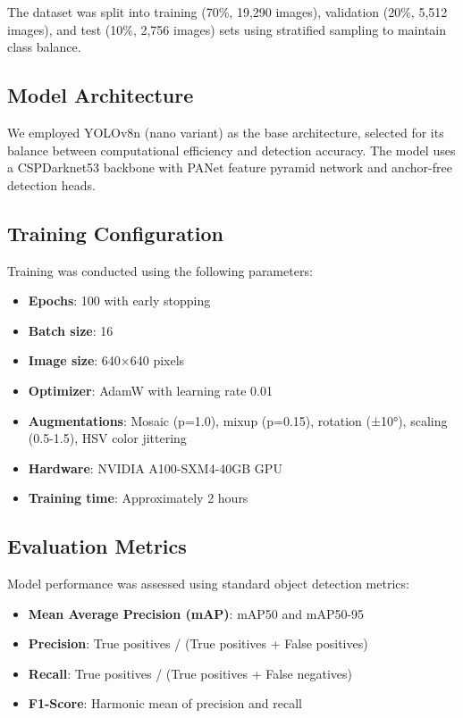 \documentclass[10pt,twocolumn]{article}
\begin{document}
The dataset was split into training (70\%, 19,290 images), validation (20\%, 5,512 images), and test (10\%, 2,756 images) sets using stratified sampling to maintain class balance.

\subsection{Model Architecture}

We employed YOLOv8n (nano variant) as the base architecture, selected for its balance between computational efficiency and detection accuracy. The model uses a CSPDarknet53 backbone with PANet feature pyramid network and anchor-free detection heads.

\subsection{Training Configuration}

Training was conducted using the following parameters:
\begin{itemize}
\item \textbf{Epochs}: 100 with early stopping
\item \textbf{Batch size}: 16
\item \textbf{Image size}: 640×640 pixels
\item \textbf{Optimizer}: AdamW with learning rate 0.01
\item \textbf{Augmentations}: Mosaic (p=1.0), mixup (p=0.15), rotation (±10°), scaling (0.5-1.5), HSV color jittering
\item \textbf{Hardware}: NVIDIA A100-SXM4-40GB GPU
\item \textbf{Training time}: Approximately 2 hours
\end{itemize}

\subsection{Evaluation Metrics}

Model performance was assessed using standard object detection metrics:
\begin{itemize}
\item \textbf{Mean Average Precision (mAP)}: mAP50 and mAP50-95
\item \textbf{Precision}: True positives / (True positives + False positives)
\item \textbf{Recall}: True positives / (True positives + False negatives)
\item \textbf{F1-Score}: Harmonic mean of precision and recall
\end{itemize}
\end{document}
